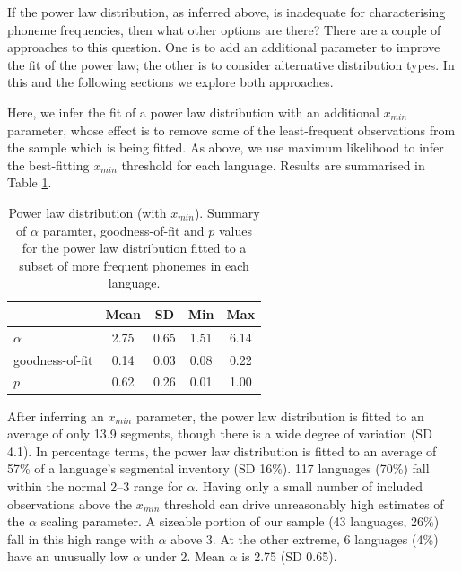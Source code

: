If the power law distribution, as inferred above, is inadequate for characterising phoneme frequencies, then what other options are there? There are a couple of approaches to this question. One is to add an additional parameter to improve the fit of the power law; the other is to consider alternative distribution types. In this and the following sections we explore both approaches.

Here, we infer the fit of a power law distribution with an additional \(x_{min}\) parameter, whose effect is to remove some of the least-frequent observations from the sample which is being fitted. As above, we use maximum likelihood to infer the best-fitting \(x_{min}\) threshold for each language. Results are summarised in Table \ref{tab:pl-xmin-summary}.

\begin{table}

\caption[Power law distribution (with $x_{min}$)]{\label{tab:pl-xmin-summary}Power law distribution (with $x_{min}$). Summary of $\alpha$ paramter, goodness-of-fit and $p$ values for the power law distribution fitted to a subset of more frequent phonemes in each language.}
\centering
\begin{tabular}[t]{lcccc}
\toprule
\textbf{ } & \textbf{Mean} & \textbf{SD} & \textbf{Min} & \textbf{Max}\\
\midrule
$\alpha$ & 2.75 & 0.65 & 1.51 & 6.14\\
goodness-of-fit & 0.14 & 0.03 & 0.08 & 0.22\\
$p$ & 0.62 & 0.26 & 0.01 & 1.00\\
\bottomrule
\end{tabular}
\end{table}

After inferring an \(x_{min}\) parameter, the power law distribution is fitted to an average of only 13.9 segments, though there is a wide degree of variation (SD 4.1). In percentage terms, the power law distribution is fitted to an average of 57\% of a language's segmental inventory (SD 16\%). 117 languages (70\%) fall within the normal 2--3 range for \(\alpha\). Having only a small number of included observations above the \(x_{min}\) threshold can drive unreasonably high estimates of the \(\alpha\) scaling parameter. A sizeable portion of our sample (43 languages, 26\%) fall in this high range with \(\alpha\) above 3. At the other extreme, 6 languages (4\%) have an unusually low \(\alpha\) under 2. Mean \(\alpha\) is 2.75 (SD 0.65).

